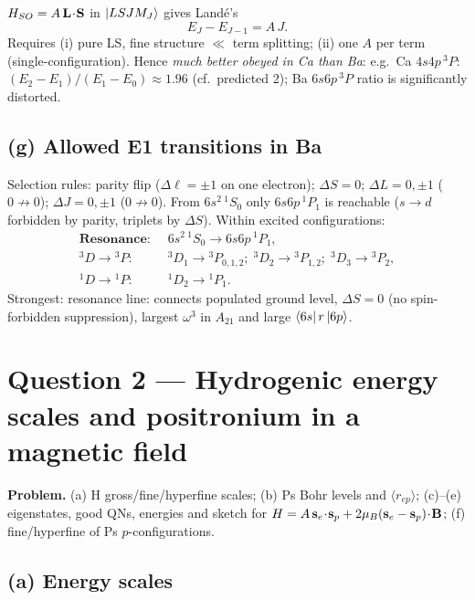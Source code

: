 \documentclass[11pt]{article}
\begin{document}
$H_{SO}=A\,\vb L\!\cdot\!\vb S$ in $\ket{LSJM_J}$ gives Land\'e's
\begin{equation}
E_J - E_{J-1} = A\,J.
\label{eq:lande}
\end{equation}
Requires (i) pure LS, fine structure $\ll$ term splitting; (ii) one $A$ per term (single-configuration). Hence \emph{much better obeyed in Ca than Ba}: e.g.\ Ca $4s4p\,^3P$: $(E_2-E_1)/(E_1-E_0)\approx 1.96$ (cf.\ predicted 2); Ba $6s6p\,^3P$ ratio is significantly distorted.

\subsection*{(g) Allowed E1 transitions in Ba}

Selection rules: parity flip ($\Delta\ell=\pm 1$ on one electron); $\Delta S=0$; $\Delta L=0,\pm 1$ ($0\not\to 0$); $\Delta J=0,\pm 1$ ($0\not\to 0$). From $6s^2\,^1S_0$ only $6s6p\,^1P_1$ is reachable ($s\to d$ forbidden by parity, triplets by $\Delta S$). Within excited configurations:
\begin{align*}
\textbf{Resonance:}\;\; & 6s^{2}\,{}^{1}S_0 \to 6s6p\,{}^{1}P_1, \\
{}^{3}D\!\to\!{}^{3}P:\;\; & {}^{3}D_1\to{}^{3}P_{0,1,2};\;{}^{3}D_2\to{}^{3}P_{1,2};\;{}^{3}D_3\to{}^{3}P_2, \\
{}^{1}D\!\to\!{}^{1}P:\;\; & {}^{1}D_2 \to {}^{1}P_1.
\end{align*}
Strongest:  resonance line: connects populated ground level, $\Delta S=0$ (no spin-forbidden suppression), largest $\omega^3$ in $A_{21}$ and large $\bra{6s}r\ket{6p}$.

\section*{Question 2 --- Hydrogenic energy scales and positronium in a magnetic field}

\textbf{Problem.} (a) H gross/fine/hyperfine scales; (b) Ps Bohr levels and $\langle r_{ep}\rangle$; (c)--(e) eigenstates, good QNs, energies and sketch for $H=A\,\vb s_e\!\cdot\!\vb s_p+2\mu_B(\vb s_e-\vb s_p)\!\cdot\!\vb B$; (f) fine/hyperfine of Ps $p$-configurations.

\subsection*{(a) Energy scales}
\end{document}
